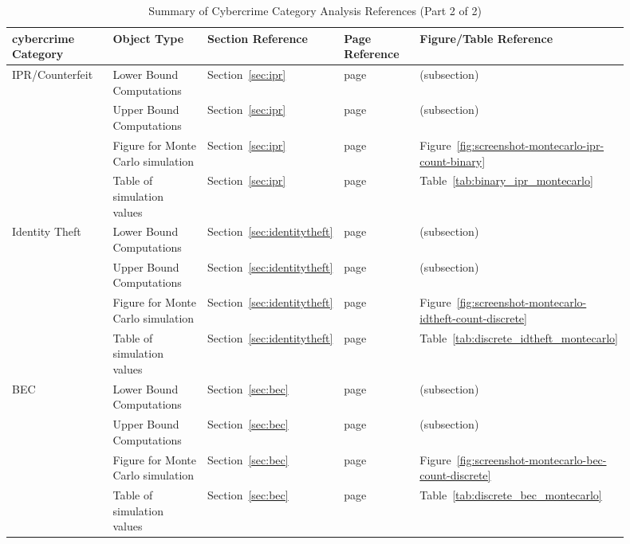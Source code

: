 \begin{table}[H]
  \centering
  \caption{Summary of Cybercrime Category Analysis References (Part 2 of 2)}
  \label{tab:cybercrime-anova-summary-2}
  \small
  \begin{tabular}{@{}p{0.18\linewidth}p{0.18\linewidth}p{0.18\linewidth}p{0.14\linewidth}p{0.22\linewidth}@{}}
    \toprule
    \textbf{\gls{cybercrime} Category} & \textbf{Object Type} & \textbf{Section Reference} & \textbf{Page Reference} & \textbf{Figure/Table Reference} \\
    \midrule
    IPR/Counterfeit & Lower Bound Computations & Section~\ref{sec:ipr} & page~\pageref{sec:ipr} & (subsection) \\
    & Upper Bound Computations & Section~\ref{sec:ipr} & page~\pageref{sec:ipr} & (subsection) \\
    & Figure for Monte Carlo simulation & Section~\ref{sec:ipr} & page~\pageref{fig:screenshot-montecarlo-ipr-count-binary} & Figure~\ref{fig:screenshot-montecarlo-ipr-count-binary} \\
    & Table of simulation values & Section~\ref{sec:ipr} & page~\pageref{tab:binary_ipr_montecarlo} & Table~\ref{tab:binary_ipr_montecarlo} \\
    \midrule
    Identity Theft & Lower Bound Computations & Section~\ref{sec:identitytheft} & page~\pageref{sec:identitytheft} & (subsection) \\
    & Upper Bound Computations & Section~\ref{sec:identitytheft} & page~\pageref{sec:identitytheft} & (subsection) \\
    & Figure for Monte Carlo simulation & Section~\ref{sec:identitytheft} & page~\pageref{fig:screenshot-montecarlo-idtheft-count-discrete} & Figure~\ref{fig:screenshot-montecarlo-idtheft-count-discrete} \\
    & Table of simulation values & Section~\ref{sec:identitytheft} & page~\pageref{tab:discrete_idtheft_montecarlo} & Table~\ref{tab:discrete_idtheft_montecarlo} \\
    \midrule
    BEC & Lower Bound Computations & Section~\ref{sec:bec} & page~\pageref{sec:bec} & (subsection) \\
    & Upper Bound Computations & Section~\ref{sec:bec} & page~\pageref{sec:bec} & (subsection) \\
    & Figure for Monte Carlo simulation & Section~\ref{sec:bec} & page~\pageref{fig:screenshot-montecarlo-bec-count-discrete} & Figure~\ref{fig:screenshot-montecarlo-bec-count-discrete} \\
    & Table of simulation values & Section~\ref{sec:bec} & page~\pageref{tab:discrete_bec_montecarlo} & Table~\ref{tab:discrete_bec_montecarlo} \\

\end{tabular}
\end{table}
